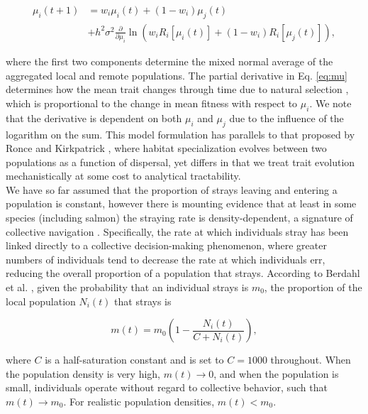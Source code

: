 \documentclass{revtex4}
\begin{document}
\begin{align}
  \label{eq:mu}
  \mu_i(t+1) &= w_i\mu_i(t) + (1-w_i)\mu_j(t) \\ \nonumber
  &+ h^2\sigma^2\frac{\partial}{\partial \mu_i}\ln\left(w_i R_i[\mu_i(t)] + (1-w_i)R_i[\mu_j(t)]  \right),
\end{align}

\noindent where the first two components determine the mixed normal average of the aggregated local and remote populations.
The partial derivative in Eq. \ref{eq:mu} determines how the mean trait changes through time due to natural selection \citep{Lande:1976ga}, which is proportional to the change in mean fitness with respect to $\mu_i$.
We note that the derivative is dependent on both $\mu_i$ and $\mu_j$ due to the influence of the logarithm on the sum.
This model formulation has parallels to that proposed by Ronce and Kirkpatrick \citep{Ronce:2001dp}, where habitat specialization evolves between two populations as a function of dispersal, yet differs in that we treat trait evolution mechanistically at some cost to analytical tractability.
\\

\noindent We have so far assumed that the proportion of strays leaving and entering a population is constant, however there is mounting evidence that at least in some species (including salmon) the straying rate is density-dependent, a signature of collective navigation \citep{Berdahl:2014bl,Berdahl:2017uu}.
Specifically, the rate at which individuals stray has been linked directly to a collective decision-making phenomenon, where greater numbers of individuals tend to decrease the rate at which individuals err, reducing the overall proportion of a population that strays.
According to Berdahl et al. \citep{Berdahl:2016dx}, given the probability that an individual strays is $m_0$, the proportion of the local population $N_i(t)$ that strays is

\begin{equation}
  m(t) = m_0\left(1- \frac{N_i(t)}{C+N_i(t)}\right),
  \label{eq:ddm}
\end{equation}

\noindent where $C$ is a half-saturation constant and is set to $C=1000$ throughout.
When the population density is very high, $m(t) \rightarrow 0$, and when the population is small, individuals operate without regard to collective behavior, such that $m(t) \rightarrow m_0$.
For realistic population densities, $m(t) < m_0$.\\
\end{document}
